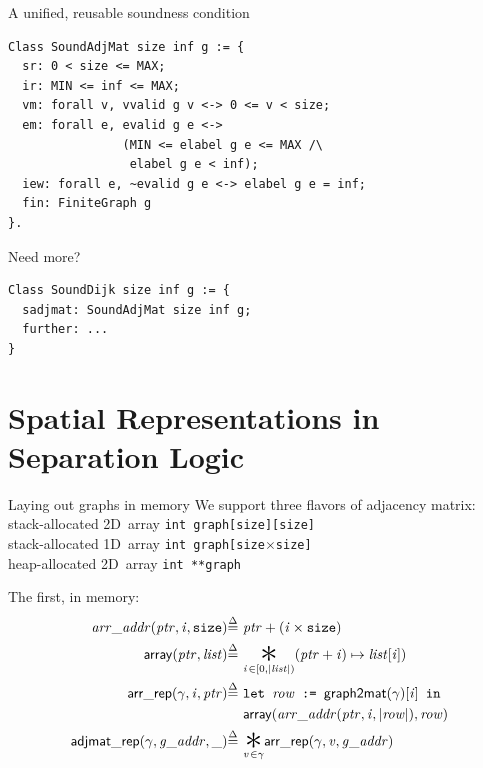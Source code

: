 \documentclass[usenames, xcolor=dvipsnames]{beamer}
\newcommand{\scon}{\mathbin{\ast}}
\renewcommand{\bigstar}{\raisebox{-0.24em}{{\scaleobj{2.5}{\scon}}}}
\newcommand{\defeq}{\mathbin{\stackrel{\Delta}{=}}}
\newcommand{\hide}[1]{}
\newcommand{\m}[1]{\ensuremath{\mathit{#1}}} %
\newcommand{\p}[1]{\ensuremath{\mathsf{#1}}} %
\begin{document}
\begin{frame}[fragile]{A unified, reusable soundness condition}

\begin{Verbatim}
Class SoundAdjMat size inf g := {
  sr: 0 < size <= MAX;
  ir: MIN <= inf <= MAX; 
  vm: forall v, vvalid g v <-> 0 <= v < size;
  em: forall e, evalid g e <-> 
                (MIN <= elabel g e <= MAX /\ 
                 elabel g e < inf);
  iew: forall e, ~evalid g e <-> elabel g e = inf;
  fin: FiniteGraph g
}.
\end{Verbatim}

\pause \bigskip

Need more?
\begin{Verbatim}
Class SoundDijk size inf g := {
  sadjmat: SoundAdjMat size inf g;
  further: ...
}
\end{Verbatim}

\end{frame}


\section{Spatial Representations in Separation Logic}

\begin{frame}{Laying out graphs in memory}
We support three flavors of adjacency matrix: \\
\hspace{1em}stack-allocated 2D~array \texttt{int~graph[size][size]} \\
\hspace{1em}stack-allocated 1D~array \texttt{int~graph[size$\times$size]} \\
\hspace{1em}heap-allocated 2D~array \texttt{int~**graph}

\bigskip \pause
The first, in memory: 
\vspace{-0.8em}
\begin{equation*}
\begin{split}
\m{arr\_addr} (\m{ptr}, \m{i},\texttt{size}) \defeq~&
  \m{ptr} + (\m{i} \times \hide{\texttt{sizeof}(\texttt{int}) \times} \texttt{size}) \\
\mathsf{array}(\m{ptr},\m{list}) \defeq~& \underset{\m{i}\hspace{0.1em} \in [0, \lvert\m{list}\rvert)}{\bigstar} (\m{ptr} + \m{i}) \mapsto \m{list}[\m{i}]) \\
\p{arr\_rep}(\gamma, \m{i}, \m{ptr}) \defeq~& \texttt{let }\m{row} \texttt{ := }\mathsf{graph2mat}(\gamma)[\m{i}] \texttt{ in } \\
&\mathsf{array}(\m{arr\_addr}(\m{ptr},\m{i},\lvert\m{row}\rvert), \m{row}) \\
\vspace{1em}
\p{adjmat\_rep}(\gamma, \m{g\_addr}, \_) \defeq~& \underset{\m{v}\hspace{0.1em} \in \gamma}{\bigstar} \p{arr\_rep}(\gamma, \m{v}, \m{g\_addr})
\end{split}
\end{equation*}

\end{frame}
\end{document}

